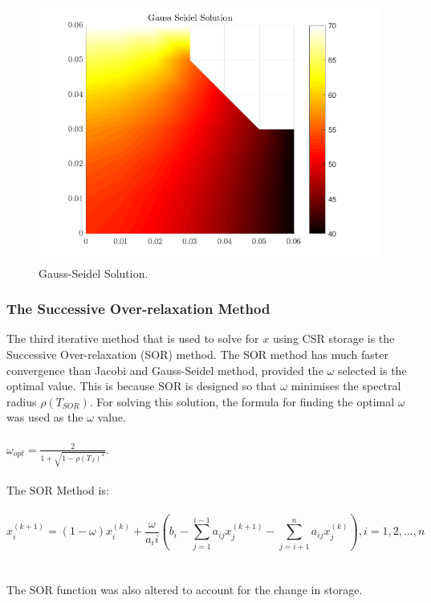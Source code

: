 \documentclass[12pt,a4paper]{article}
\begin{document}
\begin{figure}[H]
	\includegraphics[width=\linewidth]{images/gaussseidelsolution.png}
	\caption{Gauss-Seidel Solution.}
	\label{fig:gauss}
\end{figure}

\subsubsection{The Successive Over-relaxation Method}
The third iterative method that is used to solve for $x$ using CSR storage is the Successive Over-relaxation (SOR) method. The SOR method has much faster convergence than Jacobi and Gauss-Seidel method, provided the $\omega$ selected is the optimal value. This is because SOR is designed so that $\omega$ minimises the spectral radius $\rho(T_{SOR})$. For solving this solution, the formula for finding the optimal $\omega$ was used as the $\omega$ value.
\\\\
$\omega_{opt} = \frac{2}{1+\sqrt{1-\rho(T_{J})^{2}}}$.
\\\\
The SOR Method is: 
\\\\
$$x_{i}^{(k+1)} = (1-\omega)x_{i}^{(k)}+\frac{\omega}{a_ii}(b_i-\sum_{j=1}^{i-1}a_{ij}x_{j}^{(k+1)}-\sum_{j=i+1}^{n}a_{ij}x_{j}^{(k)}), i = 1, 2, ..., n$$
\\\\
The SOR function was also altered to account for the change in storage.
\end{document}
